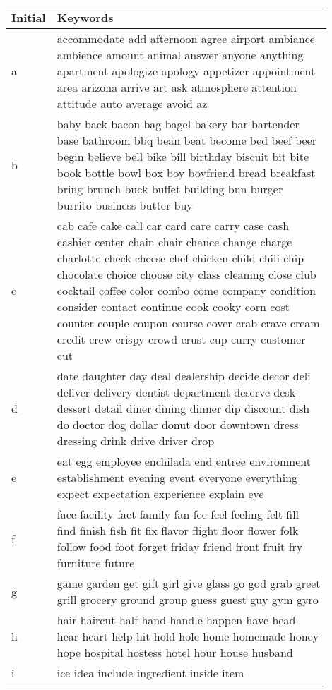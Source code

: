 \documentclass[11pt]{article}
\begin{document}
\begin{table}
\small
 \setlength\tabcolsep{3pt}
    \centering
    \begin{tabular}{p{0.05\linewidth}p{0.85\linewidth}}
    \toprule
    Initial & Keywords\\
    \midrule
    a & accommodate add afternoon agree airport ambiance ambience amount animal answer anyone anything apartment apologize apology appetizer appointment area arizona arrive art ask atmosphere attention attitude auto average avoid az \\
    \midrule
    b & baby back bacon bag bagel bakery bar bartender base bathroom bbq bean beat become bed beef beer begin believe bell bike bill birthday biscuit bit bite book bottle bowl box boy boyfriend bread breakfast bring brunch buck buffet building bun burger burrito business butter buy \\
    \midrule
    c & cab cafe cake call car card care carry case cash cashier center chain chair chance change charge charlotte check cheese chef chicken child chili chip chocolate choice choose city class cleaning close club cocktail coffee color combo come company condition consider contact continue cook cooky corn cost counter couple coupon course cover crab crave cream credit crew crispy crowd crust cup curry customer cut \\
    \midrule
    d & date daughter day deal dealership decide decor deli deliver delivery dentist department deserve desk dessert detail diner dining dinner dip discount dish do doctor dog dollar donut door downtown dress dressing drink drive driver drop \\
    \midrule
    e & eat egg employee enchilada end entree environment establishment evening event everyone everything expect expectation experience explain eye \\
    \midrule
    f & face facility fact family fan fee feel feeling felt fill find finish fish fit fix flavor flight floor flower folk follow food foot forget friday friend front fruit fry furniture future \\
    \midrule
    g & game garden get gift girl give glass go god grab greet grill grocery ground group guess guest guy gym gyro \\
    \midrule
    h & hair haircut half hand handle happen have head hear heart help hit hold hole home homemade honey hope hospital hostess hotel hour house husband \\
    \midrule
    i & ice idea include ingredient inside item \\

\end{tabular}
\end{table}
\end{document}
